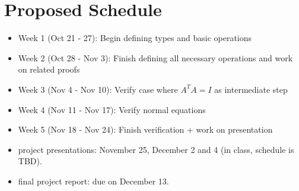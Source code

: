 \documentclass[10pt]{article}
\begin{document}
\section{Proposed Schedule}
\begin{itemize}
\item Week 1 (Oct 21 - 27): Begin defining types and basic operations
\item Week 2 (Oct 28 - Nov 3): Finish defining all necessary operations and work on related proofs
\item Week 3 (Nov 4 - Nov 10): Verify case where $A^T A = I$ as intermediate step
\item Week 4 (Nov 11 - Nov 17): Verify normal equations
\item Week 5 (Nov 18 - Nov 24): Finish verification + work on presentation
\item project presentations: November 25, December 2 and 4 (in class, schedule is TBD).
\item final project report: due on December 13.
\end{itemize}
\end{document}
